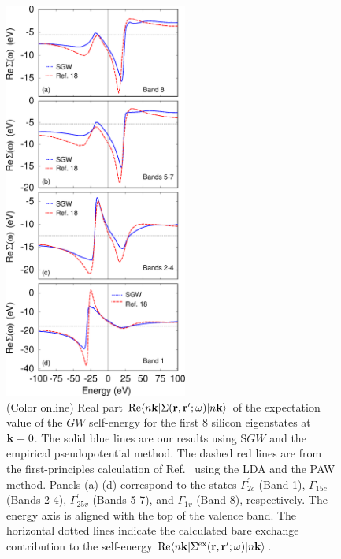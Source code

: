 \documentclass[twocolumn,prb,showpacs,superscriptaddress]{revtex4}
\def\w{\omega}
\def\k{{\bf k}}
\def\r{{\bf r}}
\def\rp{{\bf r^\prime}}
\begin{document}
\begin  {figure}
\begin  {center}
\includegraphics[width=6cm]{fig4.eps}
\end    {center}
\caption{\label{fig4}
        (Color online)
        Real part ${\rm Re} \langle n\k| \Sigma(\r,\rp;\w)|n\k\rangle$   of the expectation value of the $GW$ self-energy for the first 
        8 silicon eigenstates at $\k=0$. The solid blue lines are our results using S$GW$ and the empirical
        pseudopotential method. The dashed red lines are from the first-principles calculation of Ref.\  
        using the LDA and the PAW method. Panels (a)-(d) correspond to the states
        $\Gamma^\prime_{2c}$ (Band 1), $\Gamma_{15c}$ (Bands 2-4), $\Gamma^\prime_{25v}$ (Bands 5-7), 
        and $\Gamma_{1v}$ (Band 8), respectively. The energy axis is aligned with the top of the valence band.
        The horizontal dotted lines indicate the calculated bare exchange contribution to the self-energy ${\rm Re} \langle n\k| \Sigma^{\rm ex}(\r,\rp;\w)|n\k\rangle$.
        }
\end    {figure}
\end{document}
